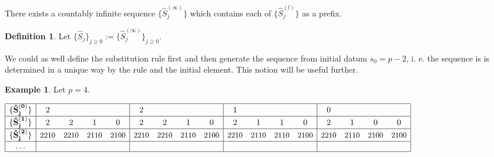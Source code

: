 \documentclass[a4paper]{article}
\theoremstyle{plain}
\theoremstyle{definition}
\newtheorem{definition}{Definition}
\newtheorem*{example}{Example}
\begin{document}
There exists a countably infinite sequence $\{ \hat{S}_j^{(\infty)}\}$ which contains each of $\{ \hat{S}_j^{(l)}\}$ as a prefix.
\begin{definition}
Let $\{\hat{S}_j\}_{j \ge 0} := \{ \hat{S}_j^{(\infty)}\}_{j \ge 0}$.
\end{definition}

We could as well define the substitution rule first and then generate the sequence from initial datum $s_0 = p-2$, i. e. the sequence is is determined in a unique way by the rule and the initial element. This notion will be useful further.

\begin{example}
Let $p=4$.

$\begin{array}{|c|cccc|cccc|cccc|cccc|}
\hline
\{ \mathbf{\hat{S}_j^{(0)}}\} & 2 & & & & 2 & & & & 1 & & & & 0 & & & \\
\hline
\{ \mathbf{\hat{S}_j^{(1)}}\} & 2 & 2 & 1 & 0 & 2 & 2 & 1 & 0 & 2 & 1 & 1 & 0 & 2 & 1 & 0 & 0 \\
\hline
\{ \mathbf{\hat{S}_j^{(2)}}\} &
\text{\small{2210}} & \text{\small{2210}} & \text{\small{2110}} & \text{\small{2100}} &
\text{\small{2210}} & \text{\small{2210}} & \text{\small{2110}} & \text{\small{2100}} &
\text{\small{2210}} & \text{\small{2110}} & \text{\small{2110}} & \text{\small{2100}} &
\text{\small{2210}} & \text{\small{2110}} & \text{\small{2100}} & \text{\small{2100}} \\
\hline
 \mathbf{\ldots} & & & & & & & & & & & & & & & & \\
\hline
\end{array} $
\end{example}
\end{document}
